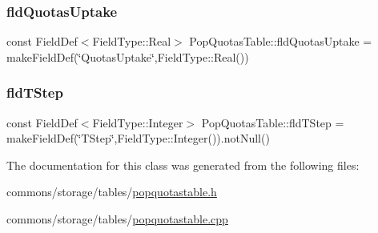 \mbox{\label{class_pop_quotas_table_aef5f5346d2024b2bffa996eb723e275d}} 
\subsubsection{\texorpdfstring{fldQuotasUptake}{fldQuotasUptake}}
{\footnotesize\ttfamily const Field\+Def$<$Field\+Type\+::\+Real$>$ Pop\+Quotas\+Table\+::fld\+Quotas\+Uptake = make\+Field\+Def(\char`\"{}Quotas\+Uptake\char`\"{},Field\+Type\+::\+Real())}

\mbox{\label{class_pop_quotas_table_ab62d5f68e254c679ffc29d317fbd991f}} 
\subsubsection{\texorpdfstring{fldTStep}{fldTStep}}
{\footnotesize\ttfamily const Field\+Def$<$Field\+Type\+::\+Integer$>$ Pop\+Quotas\+Table\+::fld\+T\+Step = make\+Field\+Def(\char`\"{}T\+Step\char`\"{},Field\+Type\+::\+Integer()).not\+Null()}



The documentation for this class was generated from the following files\+:\begin{DoxyCompactItemize}
\item 
commons/storage/tables/\mbox{\hyperlink{popquotastable_8h}{popquotastable.\+h}}\item 
commons/storage/tables/\mbox{\hyperlink{popquotastable_8cpp}{popquotastable.\+cpp}}\end{DoxyCompactItemize}
